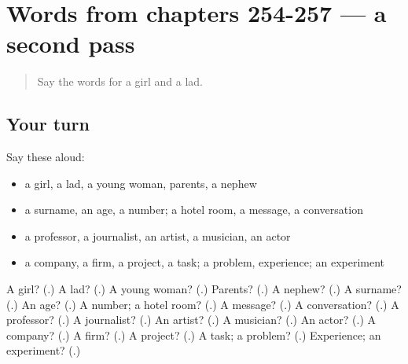 \section[(dialogue)]{Words from chapters 254-257 — a second pass}

\label{lesson:RU-R257-second-pass-words-from-chapters-254-257}



\begin{quote}
Say the words for a girl and a lad.
\end{quote}

\subsection*{Your turn}
Say these aloud:

\begin{itemize}
\raggedright
  \item a girl, a lad, a young woman, parents, a nephew
  \item a surname, an age, a number; a hotel room, a message, a conversation
  \item a professor, a journalist, an artist, a musician, an actor
  \item a company, a firm, a project, a task; a problem, experience; an experiment
\end{itemize}

\begin{tcolorbox}[breakable,colback=teal!4,colframe=teal!35!black,title={Before you move on}]
A girl? (\textbf{}.) A lad? (\textbf{}.) A young woman? (\textbf{}.) Parents? (\textbf{}.) A nephew? (\textbf{}.) A surname? (\textbf{}.) An age? (\textbf{}.) A number; a hotel room? (\textbf{}.) A message? (\textbf{}.) A conversation? (\textbf{}.) A professor? (\textbf{}.) A journalist? (\textbf{}.) An artist? (\textbf{}.) A musician? (\textbf{}.) An actor? (\textbf{}.) A company? (\textbf{}.) A firm? (\textbf{}.) A project? (\textbf{}.) A task; a problem? (\textbf{}.) Experience; an experiment? (\textbf{}.)
\end{tcolorbox}
